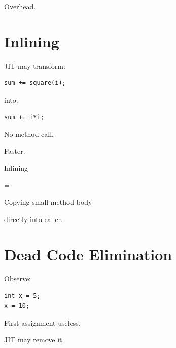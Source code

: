 \documentclass[11pt,a4paper]{book}
\begin{document}
Overhead.


\section{Inlining}

JIT may transform:

\begin{verbatim} 
sum += square(i);
\end{verbatim}

into:

\begin{verbatim} 
sum += i*i;
\end{verbatim}


No method call.


Faster.


\begin{mentalmodel}

Inlining

=

Copying small method body

directly into caller.

\end{mentalmodel}

\section{Dead Code Elimination}

Observe:

\begin{verbatim} 
int x = 5;
x = 10;
\end{verbatim}


First assignment useless.


JIT may remove it.

\end{document}
